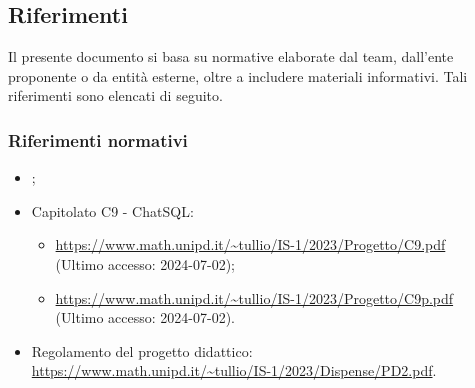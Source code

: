 \subsection{Riferimenti}
Il presente documento si basa su normative elaborate dal team, dall'ente proponente o da entità esterne, oltre a includere materiali informativi. Tali riferimenti sono elencati di seguito.
\subsubsection{Riferimenti normativi}
\begin{itemize}
  \item \NormeDiProgetto;
  \item Capitolato C9 - ChatSQL:
  \begin{itemize}
    \item \href{https://www.math.unipd.it/~tullio/IS-1/2023/Progetto/C9.pdf}{https://www.math.unipd.it/\textasciitilde tullio/IS-1/2023/Progetto/C9.pdf} \\ (Ultimo accesso: 2024-07-02);
    \item \href{https://www.math.unipd.it/~tullio/IS-1/2023/Progetto/C9.pdf}{https://www.math.unipd.it/\textasciitilde tullio/IS-1/2023/Progetto/C9p.pdf} \\ (Ultimo accesso: 2024-07-02).
  \end{itemize}
  \item Regolamento del progetto didattico:\\ \href{https://www.math.unipd.it/~tullio/IS-1/2023/Dispense/PD2.pdf}{https://www.math.unipd.it/\textasciitilde tullio/IS-1/2023/Dispense/PD2.pdf}.
\end{itemize}

